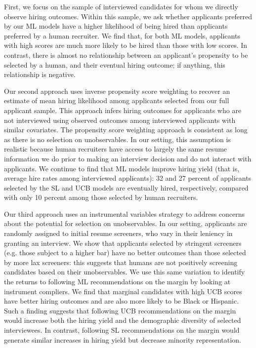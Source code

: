 \documentclass[crop,noquery,editorname,historyrev,nosurname,runningno,sepcount]{RESTUD}
\begin{document}
First, we focus on the sample of interviewed candidates for whom we directly observe hiring outcomes. Within this sample, we ask whether applicants preferred by our ML models have a higher likelihood of being hired than applicants preferred by a human recruiter. We find that, for both ML models, applicants with high scores are much more likely to be hired than those with low scores.  In contrast, there is almost no relationship between an applicant's propensity to be selected by a human, and their eventual hiring outcome; if anything, this relationship is negative.  

Our second approach uses inverse propensity score weighting to recover an estimate of mean hiring likelihood among applicants selected from our full applicant sample.  This approach infers hiring outcomes for applicants who are not interviewed using observed outcomes among interviewed applicants with similar covariates. The propensity score weighting approach is consistent as long as there is no selection on unobservables.  In our setting, this assumption is realistic because human recruiters have access to largely the same resume information we do prior to making an interview decision and do not interact with applicants. We continue to find that ML models improve hiring yield (that is, average hire rates among interviewed applicants): 32 and 27 percent of applicants selected by the SL and UCB models are eventually hired, respectively, compared with only 10 percent among those selected by human recruiters.   

Our third approach uses an instrumental variables strategy to address concerns about the potential for selection on unobservables.  In our setting, applicants are randomly assigned to initial resume screeners, who vary in their leniency in granting an interview.  We show that applicants selected by stringent screeners (e.g. those subject to a higher bar) have no better outcomes than those selected by more lax screeners: this suggests that humans are not positively screening candidates based on their unobservables.  We use this same variation to identify the returns to following ML recommendations on the margin by looking at instrument compliers.  We find that marginal candidates with high UCB scores have better hiring outcomes and are also more likely to be Black or Hispanic.  Such a finding suggests that following UCB recommendations on the margin would increase both the hiring yield and the demographic diversity of selected interviewees.  In contrast, following SL recommendations on the margin would generate similar increases in hiring yield but decrease minority representation. 
\end{document}
